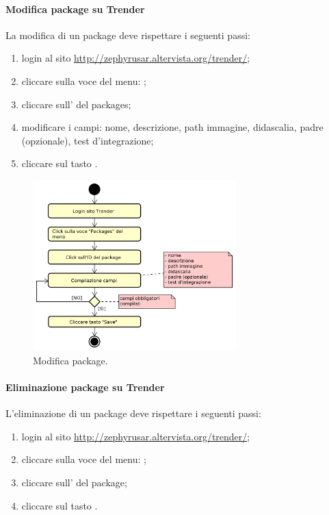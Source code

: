 		\paragraph{Modifica package su Trender} \label{sec:traccTint}
		La modifica di un package deve rispettare i seguenti passi:
		\begin{enumerate}
			\item login al sito \url{http://zephyrusar.altervista.org/trender/};
			\item cliccare sulla voce del menu: ;
			\item cliccare sull' del packages;	
			\item modificare i campi: nome, descrizione, path immagine, didascalia, padre (opzionale), test d'integrazione;
			\item cliccare sul tasto .
		\end{enumerate}
		\begin{figure}[H]
			\centering
			\includegraphics[width=0.7\textwidth]{img/ModificaPack}
			\caption{Modifica package.}
		\end{figure}
	
		\paragraph{Eliminazione package su Trender}				
		L'eliminazione di un package deve rispettare i seguenti passi:
		\begin{enumerate}
			\item login al sito \url{http://zephyrusar.altervista.org/trender/};
			\item cliccare sulla voce del menu: ;
			\item cliccare sull' del package;
			\item cliccare sul tasto .
		\end{enumerate}
		
